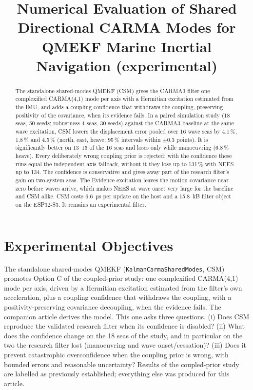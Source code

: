 \documentclass[conference]{IEEEtran}
\title{Numerical Evaluation of Shared Directional CARMA Modes for QMEKF
Marine Inertial Navigation (experimental)}
\author{%
  \IEEEauthorblockN{Mikhail S. Grushinskiy}
  \IEEEauthorblockA{Independent Researcher, USA, Fair Lawn\\
  Bareboat Necessities GitHub Project\\
  Email: mgrouch@users.github.com}%
}
\begin{document}
\maketitle

\begin{abstract}
The standalone shared-modes QMEKF (CSM) gives the CARMA3 filter one
complexified CARMA(4,1) mode per axis with a Hermitian excitation estimated
from the IMU, and adds a coupling confidence that withdraws the coupling,
preserving positivity of the covariance, when its evidence fails. In a
paired simulation study (18 seas, 50 seeds; robustness 4 seas, 30 seeds)
against the CARMA3 baseline at the same wave excitation, CSM lowers the
displacement error pooled over 16 wave seas by 4.1\,\%, 1.8\,\% and 4.5\,\%
(north, east, heave; 95\,\% intervals within $\pm0.3$ points). It is
significantly better on 13--15 of the 16 seas and loses only while
manoeuvring (6.8\,\% heave). Every deliberately wrong coupling prior is
rejected: with the confidence these runs equal the independent-axis
fallback, without it they lose up to 131\,\% with NEES up to 134. The
confidence is conservative and gives away part of the research filter's
gain on two-system seas. The Evidence excitation leaves the motion
covariance near zero before waves arrive, which makes NEES at wave onset
very large for the baseline and CSM alike. CSM costs \SI{6.6}{\micro s} per
update on the host and a \SI{15.8}{kB} filter object on the ESP32-S3. It
remains an experimental filter.
\end{abstract}

\section{Experimental Objectives}
The standalone shared-modes QMEKF (\texttt{KalmanCarmaSharedModes}, CSM)
promotes Option C of the coupled-prior study: one complexified CARMA(4,1)
mode per axis, driven by a Hermitian excitation estimated from the filter's
own acceleration, plus a coupling confidence that withdraws the coupling,
with a positivity-preserving covariance decoupling, when the evidence fails.
The companion article derives the model. This one asks three questions.
(i) Does CSM reproduce the validated research filter when its confidence is
disabled? (ii) What does the confidence change on the 18 seas of the study,
and in particular on the two the research filter lost (manoeuvring and wave
onset/cessation)? (iii) Does it prevent catastrophic overconfidence when the
coupling prior is wrong, with bounded errors and reasonable uncertainty?
Results of the coupled-prior study are labelled as previously established;
everything else was produced for this article.
\end{document}
